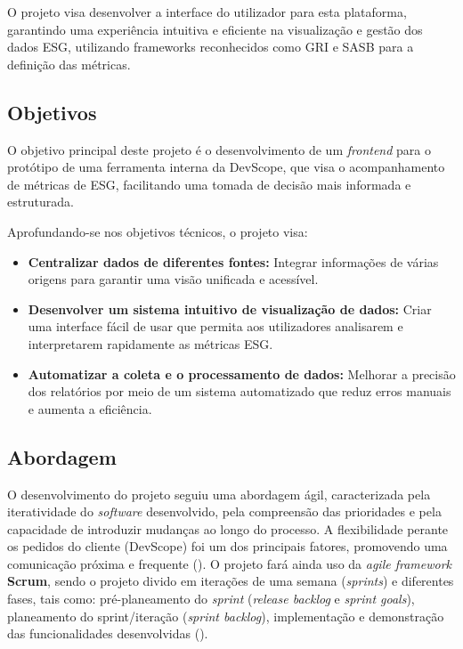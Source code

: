 O projeto visa desenvolver a interface do utilizador para esta plataforma, garantindo uma experiência intuitiva e eficiente na visualização e gestão dos dados ESG, utilizando frameworks reconhecidos como GRI e SASB para a definição das métricas.


\subsection{Objetivos}

O objetivo principal deste projeto é o desenvolvimento de um \textit{frontend} para o protótipo de uma ferramenta interna da DevScope, que visa o acompanhamento de métricas de \gls{ESG}, facilitando uma tomada de decisão mais informada e estruturada.

Aprofundando-se nos objetivos técnicos, o projeto visa:
\begin{itemize}
    \item \textbf{Centralizar dados de diferentes fontes:} Integrar informações de várias origens para garantir uma visão unificada e acessível.
    \item \textbf{Desenvolver um sistema intuitivo de visualização de dados:} Criar uma interface fácil de usar que permita aos utilizadores analisarem e interpretarem rapidamente as métricas ESG.
    \item \textbf{Automatizar a coleta e o processamento de dados:} Melhorar a precisão dos relatórios por meio de um sistema automatizado que reduz erros manuais e aumenta a eficiência.
\end{itemize}


\subsection{Abordagem} 

O desenvolvimento do projeto seguiu uma abordagem ágil, caracterizada pela iteratividade do \textit{software} desenvolvido, pela compreensão das prioridades e pela capacidade de introduzir mudanças ao longo do processo. A flexibilidade perante os pedidos do cliente (DevScope) foi um dos principais fatores, promovendo uma comunicação próxima e frequente (\cite{Patel2025}). O projeto fará ainda uso da \textit{agile framework} \textbf{Scrum}, sendo o projeto divido em iterações de uma semana (\textit{sprints}) e diferentes fases, tais como: pré-planeamento do \textit{sprint} (\textit{release backlog} e \textit{sprint goals}), planeamento do sprint/iteração (\textit{sprint backlog}), implementação e demonstração das funcionalidades desenvolvidas (\cite{Cohen2004}).

